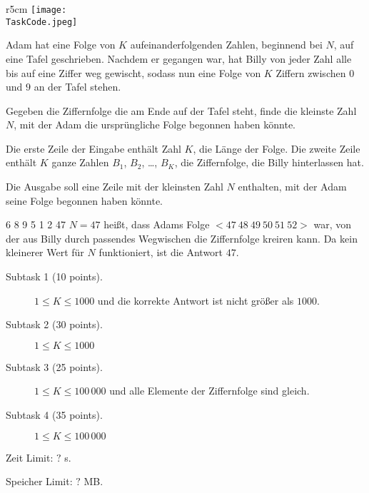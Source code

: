 \documentclass{boi2014-de}
\renewcommand{\TaskCode}{sequence}
\begin{document}
    \begin{wrapfigure}[5]{r}{5cm}
        \vspace{-24pt}
		\texttt{[image: \\TaskCode.jpeg]}
	\end{wrapfigure}

    Adam hat eine Folge von $K$ aufeinanderfolgenden Zahlen, beginnend bei $N$, auf eine Tafel geschrieben.
    Nachdem er gegangen war, hat Billy von jeder Zahl alle bis auf eine Ziffer weg gewischt,
    sodass nun eine Folge von $K$ Ziffern zwischen $0$ und $9$ an der Tafel stehen.

    \Task

    Gegeben die Ziffernfolge die am Ende auf der Tafel steht, finde die kleinste Zahl $N$, mit der Adam die ursprüngliche Folge begonnen haben könnte.

    \Input

    Die erste Zeile der Eingabe enthält Zahl $K$, die Länge der Folge.
    Die zweite Zeile enthält $K$ ganze Zahlen $B_1$, $B_2$, \dots, $B_K$, die Ziffernfolge, die Billy hinterlassen hat.

    \Output

    Die Ausgabe soll eine Zeile mit der kleinsten Zahl $N$ enthalten, mit der Adam seine Folge begonnen haben könnte.

    \Example

    \example
    {
        6 8 9 5 1 2
    }
    {
        47
    }
    {
        $N = 47$ heißt, dass Adams Folge $<47\ 48\ 49\ 50\ 51\ 52>$ war, von der aus Billy durch passendes Wegwischen die Ziffernfolge kreiren kann. Da kein kleinerer Wert für $N$ funktioniert, ist die Antwort $47$.
    }

\Scoring

\begin{description}
    \item[Subtask 1 (10 points).] $1 \le K \le 1000$ und die korrekte Antwort ist nicht größer als $1000$.
    \item[Subtask 2 (30 points).] $1 \le K \le 1000$
    \item[Subtask 3 (25 points).] $1 \le K \le 100\,000$ und alle Elemente der Ziffernfolge sind gleich.
    \item[Subtask 4 (35 points).] $1 \le K \le 100\,000$
\end{description}

\Constraints

Zeit Limit: $?$ s.

Speicher Limit: $?$ MB.
\end{document}
